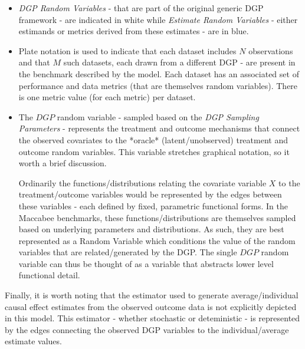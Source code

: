 \documentclass[../main.tex]{subfiles}
\begin{document}
\begin{itemize}
    \item \textit{DGP Random Variables} - that are part of the original generic DGP framework - are indicated in white while \textit{Estimate Random Variables} - either estimands or metrics derived from these estimates - are in blue.
    
    \item Plate notation is used to indicate that each dataset includes $N$ observations and that $M$ such datasets, each drawn from a different DGP - are present in the benchmark described by the model. Each dataset has an associated set of performance and data metrics (that are themselves random variables). There is one metric value (for each metric) per dataset.
    
    \item The $DGP$ random variable - sampled based on the \textit{DGP Sampling Parameters} - represents the treatment and outcome mechanisms that connect the observed covariates to the *oracle* (latent/unobserved) treatment and outcome random variables. This variable stretches graphical notation, so it worth a brief discussion.
    
    \vspace{\baselineskip}
    
    Ordinarily the functions/distributions relating the covariate variable $X$ to the treatment/outcome variables would be represented by the edges between these variables - each defined by fixed, parametric functional forms. In the Maccabee benchmarks, these functions/distributions are themselves sampled based on underlying parameters and distributions. As such, they are best represented as a Random Variable which conditions the value of the random variables that are related/generated by the DGP. The single $DGP$ random variable can thus be thought of as a variable that abstracts lower level functional detail.

\end{itemize}

Finally, it is worth noting that the estimator used to generate average/individual causal effect estimates from the observed outcome data is not explicitly depicted in this model. This estimator - whether stochastic or deteministic - is represented by the edges connecting the observed DGP variables to the individual/average estimate values.
\end{document}
